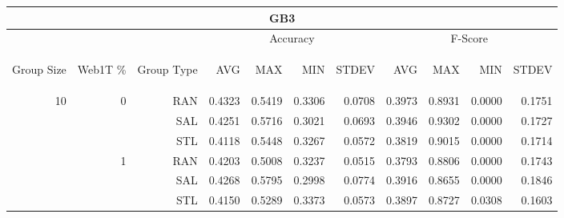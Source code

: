 \begin{center}
\begin{table}[htbp] 
 \begin{center}
\begin{tabular}{ | r | r | r | r | r | r | r | r | r | r | r |}
\hline
\multicolumn{11}{|c|}{GB3}\\
\hline
 & & & \multicolumn{4}{|c|}{Accuracy} & \multicolumn{4}{|c|}{F-Score}\\ \cline{4-11}
\begin{sideways}Group Size\end{sideways} & \begin{sideways}Web1T \%\end{sideways} & \begin{sideways}Group Type\end{sideways} & \begin{sideways}AVG\end{sideways} & \begin{sideways}MAX\end{sideways} & \begin{sideways}MIN\end{sideways} & \begin{sideways}STDEV\end{sideways} & \begin{sideways}AVG\end{sideways} & \begin{sideways}MAX\end{sideways} & \begin{sideways}MIN\end{sideways} & \begin{sideways}STDEV\end{sideways}\\
\hline
\multirow{18}{*}{10}
 & \multirow{3}{*}{0} & RAN & 0.4323 & 0.5419 & 0.3306 & 0.0708 & 0.3973 & 0.8931 & 0.0000 & 0.1751\\ \cline{3-11}
 &   & SAL & 0.4251 & 0.5716 & 0.3021 & 0.0693 & 0.3946 & 0.9302 & 0.0000 & 0.1727\\ \cline{3-11}
 &   & STL & 0.4118 & 0.5448 & 0.3267 & 0.0572 & 0.3819 & 0.9015 & 0.0000 & 0.1714\\ \cline{2-11}
 & \multirow{3}{*}{1} & RAN & 0.4203 & 0.5008 & 0.3237 & 0.0515 & 0.3793 & 0.8806 & 0.0000 & 0.1743\\ \cline{3-11}
 &   & SAL & 0.4268 & 0.5795 & 0.2998 & 0.0774 & 0.3916 & 0.8655 & 0.0000 & 0.1846\\ \cline{3-11}
 &   & STL & 0.4150 & 0.5289 & 0.3373 & 0.0573 & 0.3897 & 0.8727 & 0.0308 & 0.1603\\ \cline{2-11}

\end{tabular}
\end{center}
\end{table}
\end{center}
